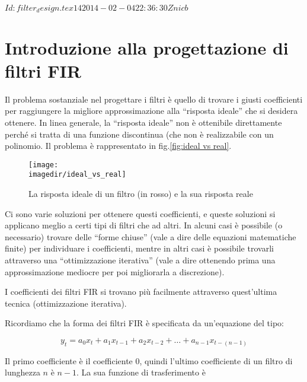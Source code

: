 %
%
%
\svnInfo $Id: filter_design.tex 14 2014-02-04 22:36:30Z nicb $

\section{Introduzione alla progettazione di filtri FIR\label{sec: filter design introduction}}
%
%

Il problema sostanziale nel progettare i filtri \`e quello di trovare i giusti
coefficienti per raggiungere la migliore approssimazione alla ``risposta ideale''
che si desidera ottenere. In linea generale, la ``risposta ideale'' non \`e
ottenibile direttamente perch\'e si tratta di una funzione discontinua (che
non \`e realizzabile con un polinomio. Il problema \`e rappresentato in
fig.\vref{fig:ideal vs real}.
\begin{figure}[htbp]
	\begin{center}
		\texttt{[image: \\imagedir/ideal\_vs\_real]}
		\caption{La risposta ideale di un filtro (in rosso) e la sua risposta reale\label{fig:ideal vs real}}
	\end{center}
\end{figure}

Ci sono varie soluzioni per ottenere questi coefficienti, e queste soluzioni
si applicano meglio a certi tipi di filtri che ad altri.
In alcuni casi \`e possibile (o necessario) trovare delle ``forme chiuse''
(vale a dire delle equazioni matematiche finite) per individuare i
coefficienti, mentre in altri casi \`e possibile trovarli attraverso una
``ottimizzazione iterativa'' (vale a dire ottenendo prima una approssimazione
mediocre per poi migliorarla a discrezione).

I coefficienti dei filtri FIR si trovano pi\`u facilmente attraverso
quest'ultima tecnica (ottimizzazione iterativa).

%
%

Ricordiamo che la forma dei filtri FIR \`e specificata da un'equazione del
tipo:

\begin{equation}
	y_t = a_0 x_t + a_1 x_{t-1} + a_2 x_{t-2} + \dots + a_{n-1} x_{t-(n-1)}
\end{equation}

Il primo coefficiente \`e il coefficiente $0$, quindi l'ultimo coefficiente di
un filtro di lunghezza $n$ \`e $n-1$. La sua funzione di trasferimento \`e

